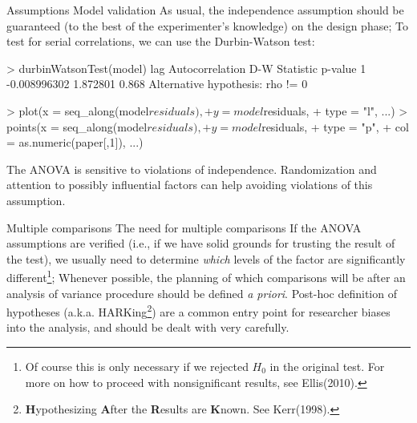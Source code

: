 \documentclass[t]{beamer}
\begin{document}
\begin{ftstf}
{Assumptions}
{Model validation}
As usual, the independence assumption should be guaranteed (to the best of the experimenter's knowledge) on the design phase;
\vhalf
To test for serial correlations, we can use the Durbin-Watson test:
\vhalf
\begin{rcode}
> durbinWatsonTest(model)
 lag Autocorrelation D-W Statistic p-value
   1    -0.008996302      1.872801   0.868
 Alternative hypothesis: rho != 0

> plot(x    = seq_along(model$residuals),
+      y    = model$residuals,
+      type = "l", ...)
> points(x    = seq_along(model$residuals),
+        y    = model$residuals,
+        type = "p",
+        col  = as.numeric(paper[,1]), ...)
\end{rcode}
\vhalf
The ANOVA is sensitive to violations of independence. Randomization and attention to possibly influential factors can help avoiding violations of this assumption.
\end{ftstf}


\begin{ftst}
{Multiple comparisons}
{The need for multiple comparisons}
If the ANOVA assumptions are verified (i.e., if we have solid grounds for trusting the result of the test), we usually need to determine \textit{which} levels of the factor are significantly different\footnote[1]{\tiny Of course this is only necessary if we rejected $H_0$ in the original test. For more on how to proceed with nonsignificant results, see Ellis(2010).};
\vone
Whenever possible, the planning of which comparisons will be after an analysis of variance procedure should be defined \textit{a priori}. Post-hoc definition of hypotheses (a.k.a.  HARKing\footnote[2]{\tiny\textbf{H}ypothesizing \textbf{A}fter the \textbf{R}esults are \textbf{K}nown. See Kerr(1998).}) are a common entry point for researcher biases into the analysis, and should be dealt with very carefully.
\end{ftst}
\end{document}
